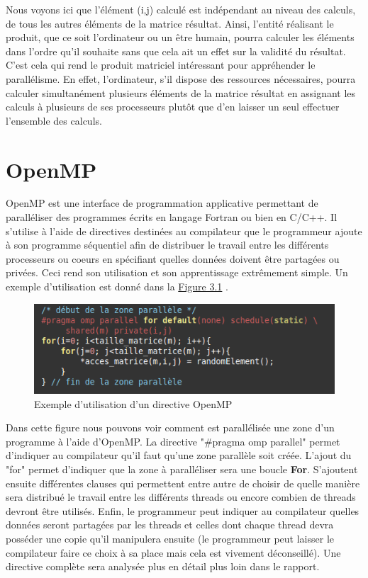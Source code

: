 Nous voyons ici que l'élément (i,j) calculé est indépendant au niveau des calculs, de tous les autres éléments de la matrice résultat. Ainsi, l'entité réalisant le produit, que ce soit l'ordinateur ou un être humain, pourra calculer les éléments dans l'ordre qu'il souhaite sans que cela ait un effet sur la validité du résultat. C'est cela qui rend le produit matriciel intéressant pour appréhender le parallélisme. En effet, l'ordinateur, s'il dispose des ressources nécessaires, pourra calculer simultanément plusieurs éléments de la matrice résultat en assignant les calculs à plusieurs de ses processeurs plutôt que d'en laisser un seul effectuer l'ensemble des calculs.

\section{OpenMP}

OpenMP est une interface de programmation applicative permettant de paralléliser des programmes écrits en langage Fortran ou bien en C/C++. Il s'utilise à l'aide de directives destinées au compilateur que le programmeur ajoute à son programme séquentiel afin de distribuer le travail entre les différents processeurs ou coeurs en spécifiant quelles données doivent être partagées ou privées. Ceci rend son utilisation et son apprentissage extrêmement simple. Un exemple d'utilisation est donné dans la \hyperref[figure:3.1]{Figure 3.1} .    
\begin{figure}[hb]

	\begin{center}
	\includegraphics[scale=0.7]{exemple_OpenMP.png} 
	\end{center}
	\caption{Exemple d'utilisation d'un directive OpenMP}
	\label{figure:3.1}

\end{figure}
Dans cette figure nous pouvons voir comment est parallélisée une zone d'un programme à l'aide d'OpenMP. La directive "\#pragma omp parallel" permet d'indiquer au compilateur qu'il faut qu'une zone parallèle soit créée. L'ajout du "for" permet d'indiquer que la zone à paralléliser sera une boucle \textbf{For}. S'ajoutent ensuite différentes clauses qui permettent entre autre de choisir de quelle manière sera distribué le travail entre les différents threads ou encore combien de threads devront être utilisés. Enfin, le programmeur peut indiquer au compilateur quelles données seront partagées par les threads et celles dont chaque thread devra posséder une copie qu'il manipulera ensuite (le programmeur peut laisser le compilateur faire ce choix à sa place mais cela est vivement déconseillé). Une directive complète sera analysée plus en détail plus loin dans le rapport. \\
 
